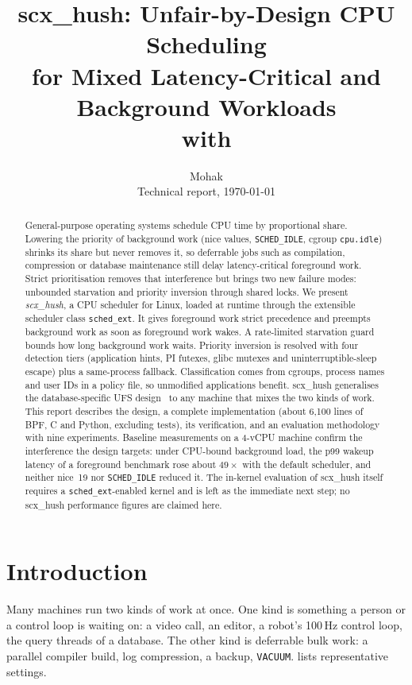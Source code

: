 \documentclass[11pt,a4paper]{article}
\title{\textbf{scx\_hush: Unfair-by-Design CPU Scheduling\\for Mixed Latency-Critical and Background Workloads\\with \code{sched\_ext}}}
\author{Mohak\\[2pt]\small Technical report, \today}
\date{}
\newcommand{\code}[1]{\texttt{#1}}
\begin{document}
\maketitle

\begin{abstract}
General-purpose operating systems schedule CPU time by proportional share.
Lowering the priority of background work (nice values, \code{SCHED\_IDLE},
cgroup \code{cpu.idle}) shrinks its share but never removes it, so
deferrable jobs such as compilation, compression or database maintenance
still delay latency-critical foreground work. Strict prioritisation removes
that interference but brings two new failure modes: unbounded starvation and
priority inversion through shared locks. We present \emph{scx\_hush}, a CPU
scheduler for Linux, loaded at runtime through the extensible scheduler class
\code{sched\_ext}. It gives foreground work strict precedence and preempts
background work as soon as foreground work wakes. A rate-limited starvation
guard bounds how long background work waits. Priority inversion is resolved
with four detection tiers (application hints, PI futexes, glibc mutexes and
uninterruptible-sleep escape) plus a same-process fallback. Classification
comes from cgroups, process names and user IDs in a policy file, so
unmodified applications benefit. scx\_hush generalises the database-specific
UFS design~\cite{ufs2026} to any machine that mixes the two kinds of work.
This report describes the design, a complete implementation (about 6{,}100
lines of BPF, C and Python, excluding tests), its verification, and an evaluation methodology
with nine experiments. Baseline measurements on a 4-vCPU machine confirm the interference
the design targets: under CPU-bound background load, the p99 wakeup latency
of a foreground benchmark rose about $49\times$ with the default scheduler,
and neither nice~19 nor \code{SCHED\_IDLE} reduced it. The in-kernel evaluation of scx\_hush itself
requires a \code{sched\_ext}-enabled kernel and is left as the immediate next
step; no scx\_hush performance figures are claimed here.
\end{abstract}

\section{Introduction}
\label{sec:intro}

Many machines run two kinds of work at once. One kind is something a person
or a control loop is waiting on: a video call, an editor, a robot's 100\,Hz
control loop, the query threads of a database. The other kind is deferrable
bulk work: a parallel compiler build, log compression, a backup,
\code{VACUUM}.  lists representative settings.
\end{document}
